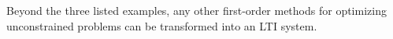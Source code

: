 \begin{table}[h!]
    \centering
\end{table}

Beyond the three listed examples, any other first-order methods for optimizing unconstrained problems can be transformed into an LTI system.



